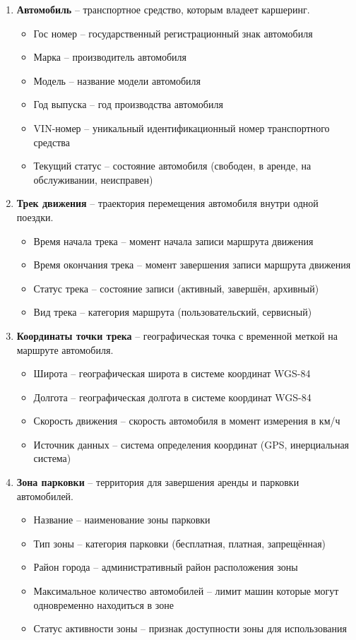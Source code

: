 \begin{enumerate}
	\item \textbf{Автомобиль} -- транспортное средство, которым владеет каршеринг.
\begin{itemize}
\item Гос номер -- государственный регистрационный знак автомобиля
\item Марка -- производитель автомобиля	
\item Модель -- название модели автомобиля
\item Год выпуска -- год производства автомобиля
\item VIN-номер -- уникальный идентификационный номер транспортного средства
\item Текущий статус -- состояние автомобиля (свободен, в аренде, на обслуживании, неисправен)
\end{itemize}

\item \textbf{Трек движения} -- траектория перемещения автомобиля внутри одной поездки.
\begin{itemize}
\item Время начала трека -- момент начала записи маршрута движения
\item Время окончания трека -- момент завершения записи маршрута движения
\item Статус трека -- состояние записи (активный, завершён, архивный)
\item Вид трека -- категория маршрута (пользовательский, сервисный)
\end{itemize}

\item \textbf{Координаты точки трека} -- географическая точка с временной меткой на маршруте автомобиля.
\begin{itemize}
\item Широта -- географическая широта в системе координат WGS-84
\item Долгота -- географическая долгота в системе координат WGS-84
\item Скорость движения -- скорость автомобиля в момент измерения в км/ч
\item Источник данных -- система определения координат (GPS, инерциальная система)
\end{itemize}

\item \textbf{Зона парковки} -- территория для завершения аренды и парковки автомобилей.
\begin{itemize}
\item Название -- наименование зоны парковки
\item Тип зоны -- категория парковки (бесплатная, платная, запрещённая)
\item Район города -- административный район расположения зоны
\item Максимальное количество автомобилей -- лимит машин которые могут одновременно находиться в зоне
\item Статус активности зоны -- признак доступности зоны для использования
\end{itemize}


\end{enumerate}
